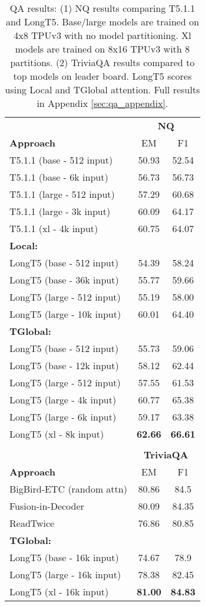 \documentclass[11pt]{article}
\begin{document}
\begin{table}
\small
\centering
\begin{tabular}{lcc}
\toprule
& \multicolumn{2}{c}{\textbf{NQ}} \\
\textbf{Approach} & EM & F1\\
\midrule
T5.1.1 (base - 512 input) & 50.93 & 52.54 \\
T5.1.1 (base - 6k input) & 56.73 & 56.73 \\
T5.1.1 (large - 512 input) & 57.29 & 60.68  \\
T5.1.1 (large - 3k input) & 60.09 & 64.17 \\
T5.1.1 (xl - 4k input) & 60.75 & 64.07  \\
\midrule
{\bf Local:} \\
LongT5 (base - 512 input) & 54.39 & 58.24\\
LongT5 (base - 36k input) & 55.77 & 59.66 \\
LongT5 (large - 512 input) & 55.19 & 58.00 \\
LongT5 (large - 10k input) & 60.01 & 64.40 \\
{\bf TGlobal:} \\
LongT5 (base - 512 input) & 55.73 & 59.06 \\
LongT5 (base - 12k input) & 58.12 & 62.44 \\
LongT5 (large - 512 input) & 57.55 & 61.53\\
LongT5 (large - 4k input) & 60.77 & 65.38 \\
LongT5 (large - 6k input) & 59.17 & 63.38 \\
LongT5 (xl - 8k input) & {\bf 62.66} & {\bf 66.61} \\
\\
\toprule
& \multicolumn{2}{c}{\textbf{TriviaQA}} \\
\textbf{Approach} & EM & F1\\
\midrule
BigBird-ETC (random attn) & 80.86 & 84.5 \\
Fusion-in-Decoder & 80.09 & 84.35\\
ReadTwice & 76.86 & 80.85 \\
\midrule
{\bf TGlobal:} \\
LongT5 (base - 16k input) & 74.67 & 78.9 \\
LongT5 (large - 16k input) & 78.38 & 82.45 \\
LongT5 (xl - 16k input) & {\bf 81.00} & {\bf 84.83}  \\
\bottomrule
\end{tabular}
\caption{QA results: (1) NQ results comparing T5.1.1 and LongT5. Base/large models are trained on 4x8 TPUv3 with no model partitioning. Xl models are trained on 8x16 TPUv3 with 8 partitions. (2) TriviaQA results compared to top models on leader board. LongT5 scores using Local and TGlobal attention. Full results in Appendix \ref{sec:qa_appendix}.}
\label{tab:QA_results}
\end{table} 
\end{document}
